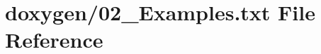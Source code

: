 \hypertarget{02__Examples_8txt}{\section{doxygen/02\+\_\+\+Examples.txt File Reference}
\label{02__Examples_8txt}
}
